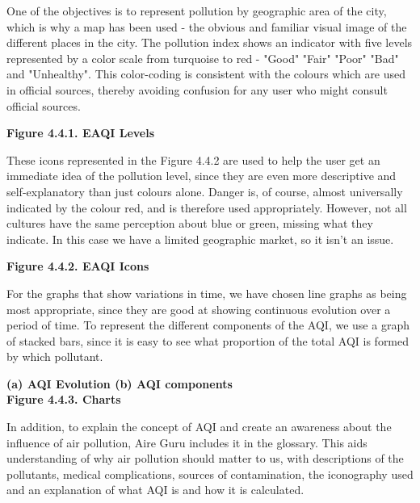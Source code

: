 One of the objectives is to represent pollution by geographic area of the city, which is why a map has been used - the 
obvious and familiar visual image of the different places in the city. The pollution index shows an indicator with 
five levels represented by a color scale from turquoise to red - "Good" "Fair" "Poor" "Bad" and "Unhealthy". 
This color-coding is consistent with the colours which are used in official sources, thereby avoiding confusion for any 
user who might consult official sources.

\begin{center}
    \bf{        
    Figure 4.4.1. EAQI Levels}
\end{center}

These icons represented in the Figure 4.4.2 are used to help the user get an immediate idea of the pollution level, since they are even more
descriptive and self-explanatory than just colours alone. Danger is, of course, almost universally indicated by 
the colour red, and is therefore used appropriately. However, not all cultures have the same perception about
blue or green, missing what they indicate. In this case we have a limited geographic market, so it isn't an issue.\\

\begin{center}
    \bf{        
    Figure 4.4.2. EAQI Icons}
\end{center}
For the graphs that show variations in time, we have chosen line graphs as being most appropriate,
since they are good at showing continuous evolution over a period of time. To represent the different components of the AQI, we use a
graph of stacked bars, since it is easy to see what proportion of the total AQI is formed by which pollutant. \\

\begin{center}
    \bf{ (a) AQI Evolution     (b) AQI components   \\
    Figure 4.4.3. Charts}
\end{center}
In addition, to explain the concept of AQI and create an awareness about the influence of air pollution, Aire Guru includes it in the
glossary. This aids understanding of why air pollution should matter to us, with descriptions of the pollutants, medical complications, sources of contamination, the iconography used and
an explanation of what AQI is and how it is calculated. \\